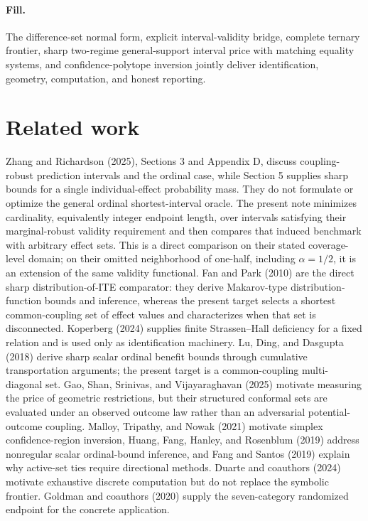 \documentclass{article}
\begin{document}
\paragraph{Fill.} The difference-set normal form, explicit interval-validity bridge, complete ternary frontier, sharp two-regime general-support interval price with matching equality systems, and confidence-polytope inversion jointly deliver identification, geometry, computation, and honest reporting.

\section{Related work}

Zhang and Richardson (2025), Sections 3 and Appendix D, discuss coupling-robust prediction intervals and the ordinal case, while Section 5 supplies sharp bounds for a single individual-effect probability mass. They do not formulate or optimize the general ordinal shortest-interval oracle. The present note minimizes cardinality, equivalently integer endpoint length, over intervals satisfying their marginal-robust validity requirement and then compares that induced benchmark with arbitrary effect sets. This is a direct comparison on their stated coverage-level domain; on their omitted neighborhood of one-half, including \(\alpha=1/2\), it is an extension of the same validity functional. Fan and Park (2010) are the direct sharp distribution-of-ITE comparator: they derive Makarov-type distribution-function bounds and inference, whereas the present target selects a shortest common-coupling set of effect values and characterizes when that set is disconnected. Koperberg (2024) supplies finite Strassen--Hall deficiency for a fixed relation and is used only as identification machinery. Lu, Ding, and Dasgupta (2018) derive sharp scalar ordinal benefit bounds through cumulative transportation arguments; the present target is a common-coupling multi-diagonal set. Gao, Shan, Srinivas, and Vijayaraghavan (2025) motivate measuring the price of geometric restrictions, but their structured conformal sets are evaluated under an observed outcome law rather than an adversarial potential-outcome coupling. Malloy, Tripathy, and Nowak (2021) motivate simplex confidence-region inversion, Huang, Fang, Hanley, and Rosenblum (2019) address nonregular scalar ordinal-bound inference, and Fang and Santos (2019) explain why active-set ties require directional methods. Duarte and coauthors (2024) motivate exhaustive discrete computation but do not replace the symbolic frontier. Goldman and coauthors (2020) supply the seven-category randomized endpoint for the concrete application.
\end{document}
